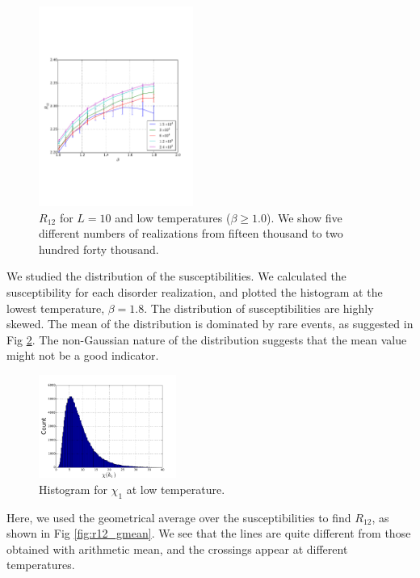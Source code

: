 \documentclass[aps,prb,twocolumn,showpacs,superscriptaddress]{revtex4}
\begin{document}
\begin{figure}[ht]
  \includegraphics[width=0.45\textwidth]{img/R12_l10_samples.pdf}
  \caption{$R_{12}$ for $L=10$ and low temperatures ($\beta \geq 1.0$). We show five different numbers of 
realizations from fifteen thousand to two hundred forty thousand.}
\label{fig:R12_l10_samples}
\end{figure}

We studied the distribution of the susceptibilities. We calculated the susceptibility
for each disorder realization, and plotted the histogram at the lowest temperature,
$\beta=1.8$.
The distribution of susceptibilities are highly skewed. 
The mean of the distribution is dominated by rare
events, as suggested in Fig \ref{fig:hist_chi}. 
The non-Gaussian nature of the distribution suggests that the mean value might 
not be a good indicator. 


\begin{figure}[ht]
  \centering
  \includegraphics[width=0.4\textwidth]{img/chi_1_dist.pdf}
  \caption{Histogram for $\chi_1$ at low temperature.}
\label{fig:hist_chi}
\end{figure}

Here, we used the geometrical average over the susceptibilities to find $R_{12}$,
as shown in Fig \ref{fig:r12_gmean}.
We see that the lines are quite different from those obtained with arithmetic 
mean, and the crossings appear at different temperatures. 
\end{document}
